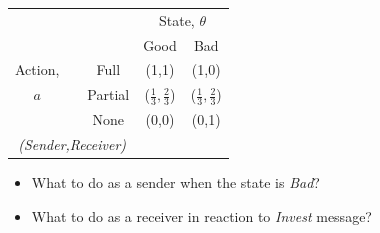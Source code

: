 \documentclass{beamer}
\begin{document}
\begin{frame}
\begin{card}
    \begin{center}%
        \begin{tabular}{c|cc|c|c|}
        \multicolumn{1}{c}{} &  & \multicolumn{1}{c}{} & \multicolumn{2}{c}{State, $\theta$} \\ 
        \cline{4-5} 
        \multicolumn{1}{c}{} &  & \multicolumn{1}{c}{} & \multicolumn{1}{c}{Good} & \multicolumn{1}{c}{Bad} \\ 
        \cline{4-5} 
        Action, &  & Full & (1,1) & (1,0) \\ 
        \cline{4-5} 
        $a$ &  & Partial & ($\frac{1}{3},\frac{2}{3}$) & ($\frac{1}{3},\frac{2}{3}$) \\ 
        \cline{4-5} 
         &  & None & (0,0) & (0,1) \\ 
        \cline{4-5} 
        \multicolumn{3}{c}{\emph{(Sender,Receiver)}}
        \end{tabular}
    \end{center}
\end{card}
\begin{card}
    \begin{itemize}
        \item What to do as a sender when the state is \emph{Bad}?
        \item What to do as a receiver in reaction to \emph{Invest} message?
    \end{itemize}
    \end{card}
\end{frame}

\end{document}
